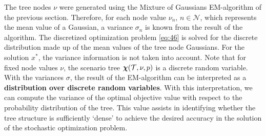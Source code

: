 The tree nodes $\nu$ were generated using the Mixture of Gaussians EM-algorithm of the previous section.
Therefore, for each node value $\nu_n,\, n\in\mathcal{N}$, which represents the mean value of a Gaussian, a variance $\sigma_n$ is known from the result of the algorithm.
The discretized optimization problem \eqref{eq:46} is solved for the discrete distribution made up of the mean values of the tree node Gaussians.
For the solution $x^*$, the variance information is not taken into account.
Note that for fixed node values $\nu$, the scenario tree $\boldsymbol\chi(\mathcal{T},\nu,p)$ is a discrete random variable.
With the variances $\sigma$, the result of the EM-algorithm can be interpreted as a \textbf{distribution over discrete random variables}.
With this interpretation, we can compute the variance of the optimal objective value with respect to the probability distribution of the tree.
This value assists in identifying whether the tree structure is sufficiently `dense' to achieve the desired accuracy in the solution of the stochastic optimization problem.

